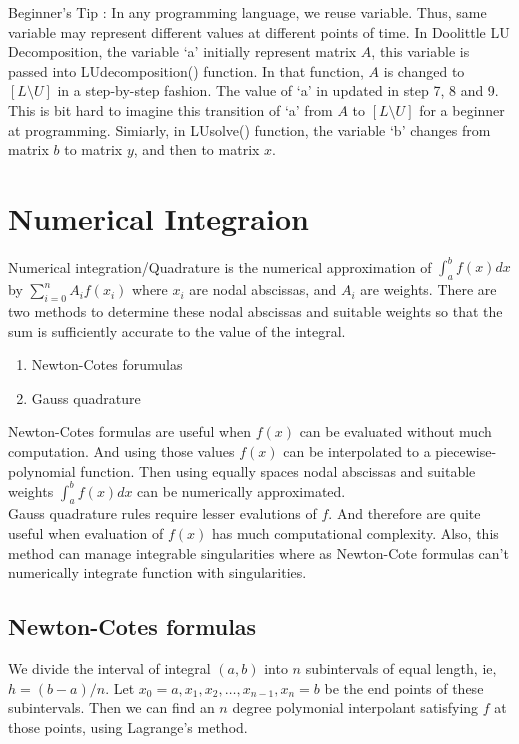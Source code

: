 \begin{commentary}
	Beginner's Tip : In any programming language, we reuse variable.
	Thus, same variable may represent different values at different points of time.
	In Doolittle LU Decomposition, the variable `a' initially represent matrix $A$, this variable is passed into LUdecomposition() function.
	In that function, $A$ is changed to $[L\text{\textbackslash{}}U]$ in a step-by-step fashion.
	The value of `a' in updated in step 7, 8 and 9.
	This is bit hard to imagine this transition of `a' from $A$ to $[L\text{\textbackslash{}}U]$ for a beginner at programming.
	Simiarly, in LUsolve() function, the variable `b' changes from matrix $b$ to matrix $y$, and then to matrix $x$.
\end{commentary}

\section{Numerical Integraion}
	Numerical integration/Quadrature is the numerical approximation of $\int_a^b f(x)dx$ by $\sum_{i=0}^n A_if(x_i)$ where $x_i$ are nodal abscissas, and $A_i$ are weights.
	There are two methods to determine these nodal abscissas and suitable weights so that the sum is sufficiently accurate to the value of the integral.
\begin{enumerate}
	\item Newton-Cotes forumulas
	\item Gauss quadrature
\end{enumerate}

	Newton-Cotes formulas are useful when $f(x)$ can be evaluated without much computation.
	And using those values $f(x)$ can be interpolated to a piecewise-polynomial function.
	Then using equally spaces nodal abscissas and suitable weights $\int_a^b f(x)dx$ can be numerically approximated.\\

	Gauss quadrature rules require lesser evalutions of $f$.
	And therefore are quite useful when evaluation of $f(x)$ has much computational complexity.
	Also, this method can manage integrable singularities where as Newton-Cote formulas can't numerically integrate function with singularities. 

\subsection{Newton-Cotes formulas}
	We divide the interval of integral $(a,b)$ into $n$ subintervals of equal length, ie, $h = (b-a)/n$.
	Let $x_0 = a, x_1, x_2,\dots,x_{n-1},x_n=b$ be the end points of these subintervals.
	Then we can find an $n$ degree polymonial interpolant satisfying $f$ at those points, using Lagrange's method.\\

